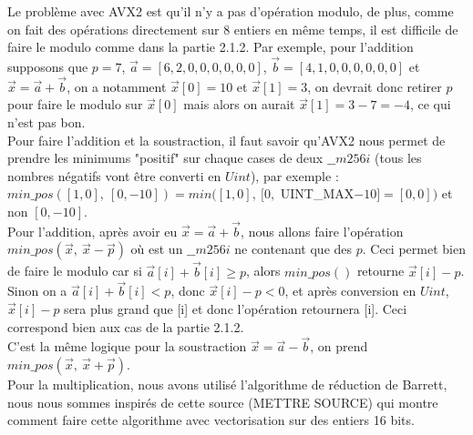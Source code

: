 \documentclass[12pt, a4paper]{article}
\begin{document}
Le problème avec AVX2 est qu'il n'y a pas d'opération modulo, de plus, comme on fait des opérations directement sur 8 entiers en même temps, il est difficile de faire le modulo comme dans la partie 2.1.2. Par exemple, pour l'addition supposons que $p = 7$, $\overrightarrow{a} = [6, 2, 0, 0, 0, 0, 0, 0]$, $\overrightarrow{b} = [4, 1, 0, 0, 0, 0, 0, 0]$ et $\overrightarrow{x} = \overrightarrow{a}+\overrightarrow{b}$, on a notamment $\overrightarrow{x}[0] = 10$ et $\overrightarrow{x}[1] = 3$, on devrait donc retirer $p$ pour faire le modulo sur $\overrightarrow{x}[0]$ mais alors on aurait $\overrightarrow{x}[1] = 3-7 = -4$, ce qui n'est pas bon.\\ 
Pour faire l'addition et la soustraction, il faut savoir qu'AVX2 nous permet de prendre les minimums "positif" sur chaque cases de deux $\_\_m256i$ (tous les nombres négatifs vont être converti en $Uint$), par exemple :\\ $min\_pos([1, 0],\  [0, -10]) = min([1, 0], \ [0,$ UINT\_MAX$-10] = [0, 0])$ et non $[0, -10]$. \\
Pour l'addition, après avoir eu $\overrightarrow{x} = \overrightarrow{a}+\overrightarrow{b}$, nous allons faire l'opération $min\_pos(\overrightarrow{x},\ \overrightarrow{x}-\overrightarrow{p})$ où  est un $\_\_m256i$ ne contenant que des $p$. Ceci permet bien de faire le modulo car si $\overrightarrow{a}[i] + \overrightarrow{b}[i] \geq p$, alors $min\_pos()$ retourne $\overrightarrow{x}[i] - p$. Sinon on a $\overrightarrow{a}[i] + \overrightarrow{b}[i] < p$, donc $\overrightarrow{x}[i]-p < 0$, et après conversion en $Uint$, $\overrightarrow{x}[i]-p$ sera plus grand que [i] et donc l'opération retournera [i]. Ceci correspond bien aux cas de la partie 2.1.2. \\
C'est la même logique pour la soustraction $\overrightarrow{x} = \overrightarrow{a}-\overrightarrow{b}$, on prend $min\_pos(\overrightarrow{x},\ \overrightarrow{x}+\overrightarrow{p})$. \\
Pour la multiplication, nous avons utilisé l'algorithme de réduction de Barrett, nous nous sommes inspirés de cette source (METTRE SOURCE) qui montre comment faire cette algorithme avec vectorisation sur des entiers 16 bits.
\end{document}
